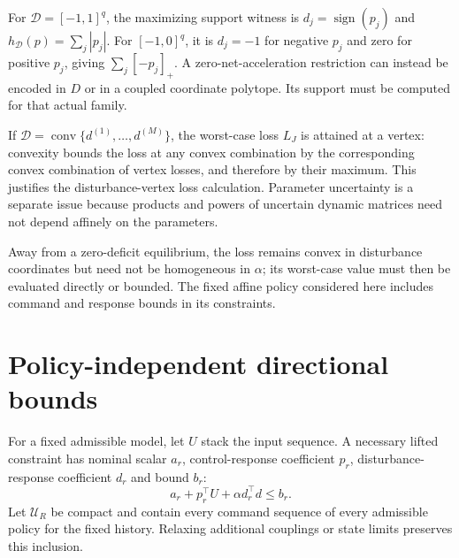 \documentclass[11pt]{article}
\begin{document}
For $\mathcal D=[-1,1]^q$, the maximizing support witness is $d_j=\operatorname{sign}(p_j)$ and $h_{\mathcal D}(p)=\sum_j|p_j|$. For $[-1,0]^q$, it is $d_j=-1$ for negative $p_j$ and zero for positive $p_j$, giving $\sum_j[-p_j]_+$. A zero-net-acceleration restriction can instead be encoded in $D$ or in a coupled coordinate polytope. Its support must be computed for that actual family.

If $\mathcal D=\operatorname{conv}\{d^{(1)},\ldots,d^{(M)}\}$, the worst-case loss $L_J$ is attained at a vertex: convexity bounds the loss at any convex combination by the corresponding convex combination of vertex losses, and therefore by their maximum. This justifies the disturbance-vertex loss calculation. Parameter uncertainty is a separate issue because products and powers of uncertain dynamic matrices need not depend affinely on the parameters.

Away from a zero-deficit equilibrium, the loss remains convex in disturbance coordinates but need not be homogeneous in $\alpha$; its worst-case value must then be evaluated directly or bounded. The fixed affine policy considered here includes command and response bounds in its constraints.

\section{Policy-independent directional bounds}
For a fixed admissible model, let $U$ stack the input sequence. A necessary lifted constraint has nominal scalar $a_r$, control-response coefficient $p_r$, disturbance-response coefficient $d_r$ and bound $b_r$:
\begin{equation}
a_r+p_r^\top U+\alpha d_r^\top d\leq b_r.
\end{equation}
Let $\mathcal U_R$ be compact and contain every command sequence of every admissible policy for the fixed history. Relaxing additional couplings or state limits preserves this inclusion.
\end{document}
